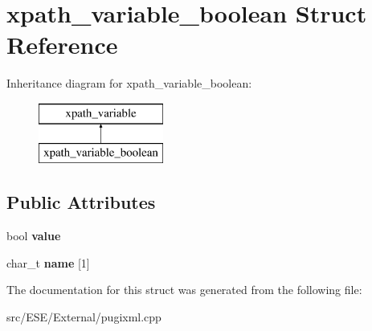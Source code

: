 \hypertarget{structxpath__variable__boolean}{\section{xpath\-\_\-variable\-\_\-boolean Struct Reference}
\label{structxpath__variable__boolean}
}
Inheritance diagram for xpath\-\_\-variable\-\_\-boolean\-:\begin{figure}[H]
\begin{center}
\leavevmode
\includegraphics[height=2.000000cm]{structxpath__variable__boolean}
\end{center}
\end{figure}
\subsection*{Public Attributes}
\begin{DoxyCompactItemize}
\item 
\hypertarget{structxpath__variable__boolean_ab54117a6cced8c3e029724651df4d404}{bool {\bfseries value}}\label{structxpath__variable__boolean_ab54117a6cced8c3e029724651df4d404}

\item 
\hypertarget{structxpath__variable__boolean_a2b2cb81ee5c9a19a667428d08d5bb951}{char\-\_\-t {\bfseries name} \mbox{[}1\mbox{]}}\label{structxpath__variable__boolean_a2b2cb81ee5c9a19a667428d08d5bb951}

\end{DoxyCompactItemize}


The documentation for this struct was generated from the following file\-:\begin{DoxyCompactItemize}
\item 
src/\-E\-S\-E/\-External/pugixml.\-cpp\end{DoxyCompactItemize}
